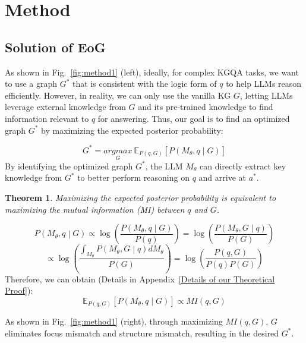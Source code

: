 \documentclass[11pt]{article}
\newtheorem{theorem}{Theorem}
\begin{document}
\section{Method}
\subsection{Solution of EoG}
As shown in Fig.~\ref{fig:method1} (left), ideally, for complex KGQA tasks, we want to use a graph $G^*$ that is consistent with the logic form of $q$ to help LLMs reason efficiently. However, in reality, we can only use the vanilla KG $G$, letting LLMs leverage external knowledge from $G$ and its pre-trained knowledge to find information relevant to $q$ for answering. Thus, our goal is to find an optimized graph $G^*$ by maximizing the expected posterior probability:

\[{G^{*} = \underset{G}{argmax}}{~\mathbb{E}_{P(q,G)}\left\lbrack P\left( M_{\theta},q \middle| G \right) \right\rbrack}\]
By identifying the optimized graph $  G^*  $, the LLM $  M_{\theta}  $ can directly extract key knowledge from $  G^*  $ to better perform reasoning on $q$ and arrive at $a^*$.
\begin{theorem}
Maximizing the expected posterior probability is equivalent to maximizing the mutual information (MI) between $q$ and $G$.
\end{theorem}
\label{theorem1}

{\small
\[P\left( M_{\theta},q \middle| G \right) \propto {\log\left( \frac{P\left( M_{\theta},q \middle| G \right)}{P(q)} \right)}{{= \log}\left( \frac{P\left( M_{\theta},G \middle| q \right)}{P(G)} \right)}\]
}
{\small
\[\propto {\log\left( \frac{\int_{M_{\theta}}^{}{P\left( M_{\theta},G \middle| q \right)dM_{\theta}}}{P(G)} \right)} = {\log\left( \frac{P\left( {q,G} \right)}{P(q)P(G)} \right)}\]
}
Therefore, we can obtain (Details in Appendix~\ref{Details of our Theoretical Proof}):
\[\mathbb{E}_{P(q,G)}\left\lbrack {P\left( M_{\theta},q \middle| G \right)} \right\rbrack \propto MI(q,G)\]

As shown in Fig.~\ref{fig:method1} (right), through maximizing $MI(q, G)$, $G$ eliminates focus mismatch and structure mismatch, resulting in the desired $G^*$.
\end{document}
